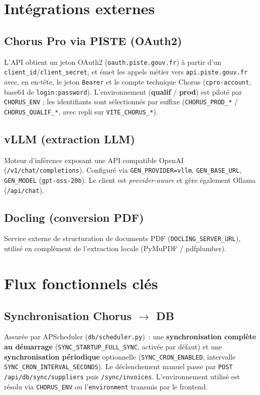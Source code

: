 \documentclass[11pt,a4paper]{article}
\newcommand{\code}[1]{\texttt{\small #1}}
\begin{document}
\section{Intégrations externes}

\subsection{Chorus Pro via PISTE (OAuth2)}
L'API obtient un jeton OAuth2 (\code{oauth.piste.gouv.fr}) à partir d'un
\code{client\_id}/\code{client\_secret}, et émet les appels métier vers
\code{api.piste.gouv.fr} avec, en en-tête, le jeton \code{Bearer} et le compte
technique Chorus (\code{cpro-account}, base64 de \code{login:password}).
L'environnement (\textbf{qualif} / \textbf{prod}) est piloté par \code{CHORUS\_ENV} ;
les identifiants sont sélectionnés par suffixe (\code{CHORUS\_PROD\_*} /
\code{CHORUS\_QUALIF\_*}, avec repli sur \code{VITE\_CHORUS\_*}).

\subsection{vLLM (extraction LLM)}
Moteur d'inférence exposant une API compatible OpenAI
(\code{/v1/chat/completions}). Configuré via \code{GEN\_PROVIDER=vllm},
\code{GEN\_BASE\_URL}, \code{GEN\_MODEL} (\code{gpt-oss-20b}). Le client est
\emph{provider-aware} et gère également Ollama (\code{/api/chat}).

\subsection{Docling (conversion PDF)}
Service externe de structuration de documents PDF (\code{DOCLING\_SERVER\_URL}),
utilisé en complément de l'extraction locale (PyMuPDF / pdfplumber).

\section{Flux fonctionnels clés}

\subsection{Synchronisation Chorus $\rightarrow$ DB}
Assurée par APScheduler (\code{db/scheduler.py})~: une \textbf{synchronisation
complète au démarrage} (\code{SYNC\_STARTUP\_FULL\_SYNC}, activée par défaut) et
une \textbf{synchronisation périodique} optionnelle
(\code{SYNC\_CRON\_ENABLED}, intervalle \code{SYNC\_CRON\_INTERVAL\_SECONDS}).
Le déclenchement manuel passe par \code{POST /api/db/sync/suppliers} puis
\code{/sync/invoices}. L'environnement utilisé est résolu via \code{CHORUS\_ENV}
ou l'\code{environment} transmis par le frontend.
\end{document}
